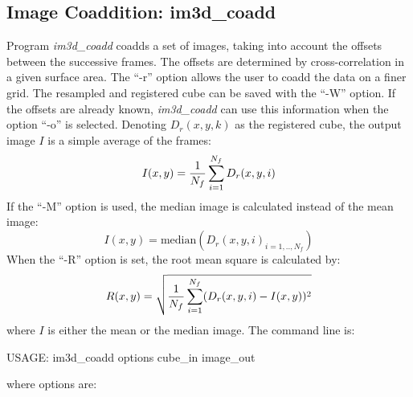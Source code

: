 \subsection{Image Coaddition: im3d\_coadd}
Program {\em im3d\_coadd} coadds a set of images, taking into account the
offsets between the successive frames. The offsets are determined by
cross-correlation in a given surface area. The ``-r'' option allows the user 
to coadd the data
on a finer grid. The resampled and registered cube can be saved with the
``-W'' option. If the offsets are already known, {\em im3d\_coadd} can use
this information when the option ``-o'' is selected. Denoting $D_r(x,y,k)$
as the registered cube, 
the output image $I$ is a simple average of the frames:
\[
 I(x,y) = {1 \over N_f} \sum_{i=1}^{N_f} D_r(x,y,i)
\]
 If the ``-M'' option is used, the median image is calculated 
 instead of the mean image:
 \[
 I(x,y) =  \mathrm{median}({D_r(x,y,i)}_{i=1,..,N_f})
\]
When the ``-R'' option is set, the root mean square is calculated by:
\[
R(x,y) = \sqrt{{1\over N_f} \sum_{i=1}^{N_f} (D_r(x,y,i) - I(x,y))^2}
\]
where $I$ is either the mean or the median image.
The command line is:
{\bf
\begin{center}
 USAGE: im3d\_coadd options cube\_in image\_out
\end{center}}
where options are:
